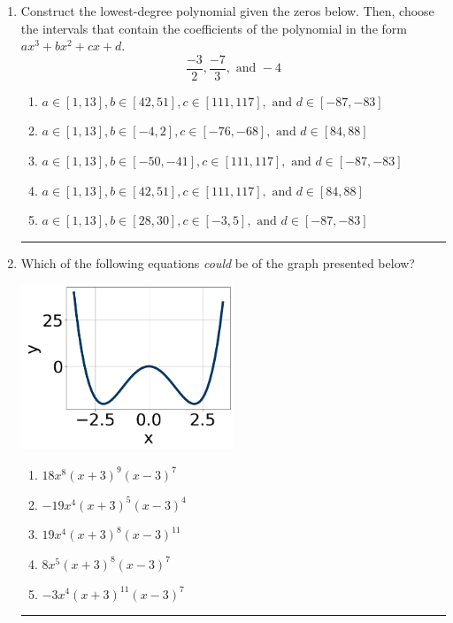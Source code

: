 \documentclass[14pt]{extbook}
\newcommand{\litem}[1]{\item#1\hspace*{-1cm}\rule{\textwidth}{0.4pt}}
\begin{document}
\begin{enumerate}
{\begin{enumerate}[label=\Alph*.]
\end{enumerate} }
\litem{
Construct the lowest-degree polynomial given the zeros below. Then, choose the intervals that contain the coefficients of the polynomial in the form $ax^3+bx^2+cx+d$.\[ \frac{-3}{2}, \frac{-7}{3}, \text{ and } -4 \]\begin{enumerate}[label=\Alph*.]
\item \( a \in [1, 13], b \in [42, 51], c \in [111, 117], \text{ and } d \in [-87, -83] \)
\item \( a \in [1, 13], b \in [-4, 2], c \in [-76, -68], \text{ and } d \in [84, 88] \)
\item \( a \in [1, 13], b \in [-50, -41], c \in [111, 117], \text{ and } d \in [-87, -83] \)
\item \( a \in [1, 13], b \in [42, 51], c \in [111, 117], \text{ and } d \in [84, 88] \)
\item \( a \in [1, 13], b \in [28, 30], c \in [-3, 5], \text{ and } d \in [-87, -83] \)

\end{enumerate} }
\litem{
Which of the following equations \textit{could} be of the graph presented below?
\begin{center}
    \includegraphics[width=0.5\textwidth]{../Figures/polyGraphToFunctionCopyB.png}
\end{center}
\begin{enumerate}[label=\Alph*.]
\item \( 18x^{8} (x + 3)^{9} (x - 3)^{7} \)
\item \( -19x^{4} (x + 3)^{5} (x - 3)^{4} \)
\item \( 19x^{4} (x + 3)^{8} (x - 3)^{11} \)
\item \( 8x^{5} (x + 3)^{8} (x - 3)^{7} \)
\item \( -3x^{4} (x + 3)^{11} (x - 3)^{7} \)


\end{enumerate}}
\end{enumerate}
\end{document}
